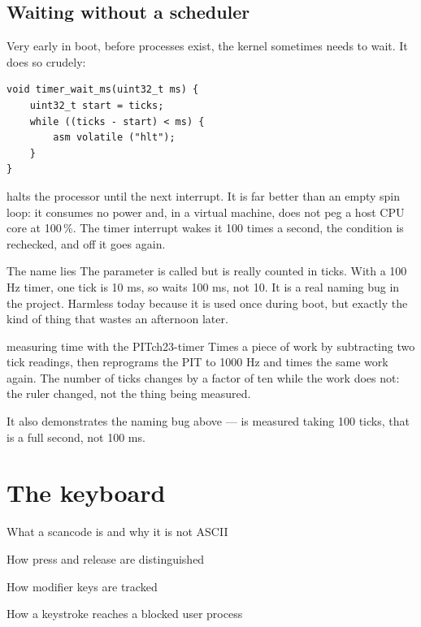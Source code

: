 \section{Waiting without a scheduler}

Very early in boot, before processes exist, the kernel sometimes needs to wait. It does so crudely:

\begin{lstlisting}[style=c]
void timer_wait_ms(uint32_t ms) {
    uint32_t start = ticks;
    while ((ticks - start) < ms) {
        asm volatile ("hlt");
    }
}
\end{lstlisting}

 halts the processor until the next interrupt. It is far better than an empty spin loop: it
consumes no power and, in a virtual machine, does not peg a host CPU core at 100\,\%. The timer
interrupt wakes it 100 times a second, the condition is rechecked, and off it goes again.

\begin{warn}{The name lies}
The parameter is called  but is really counted in ticks. With a 100 Hz timer, one tick is
10 ms, so  waits 100 ms, not 10. It is a real naming bug in the project.
Harmless today because it is used once during boot, but exactly the kind of thing that wastes an
afternoon later.
\end{warn}

\begin{recipe}{measuring time with the PIT}{ch23-timer}
Times a piece of work by subtracting two tick readings, then reprograms the PIT to 1000 Hz and
times the same work again. The number of ticks changes by a factor of ten while the work does not:
the ruler changed, not the thing being measured.

It also demonstrates the naming bug above ---  is measured taking 100
ticks, that is a full second, not 100 ms.
\end{recipe}

\chapter{The keyboard}

\begin{goals}
  \item What a scancode is and why it is not ASCII
  \item How press and release are distinguished
  \item How modifier keys are tracked
  \item How a keystroke reaches a blocked user process
\end{goals}

